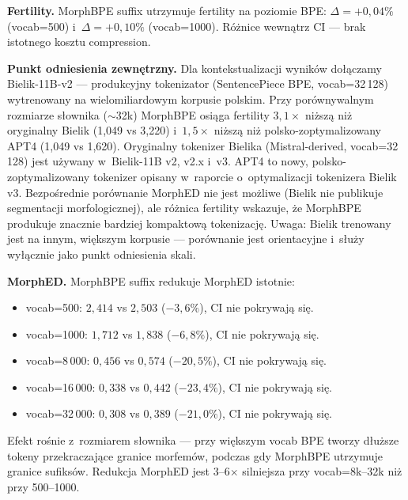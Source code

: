 \textbf{Fertility.} MorphBPE suffix utrzymuje fertility na poziomie BPE:
$\Delta = +0{,}04\%$ (vocab=500) i~$\Delta = +0{,}10\%$ (vocab=1000).
Różnice wewnątrz CI --- brak istotnego kosztu compression.

\textbf{Punkt odniesienia zewnętrzny.}
Dla kontekstualizacji wyników dołączamy Bielik-11B-v2 --- produkcyjny
tokenizator (SentencePiece BPE, vocab=32\,128) wytrenowany na wielomiliardowym
korpusie polskim. Przy porównywalnym rozmiarze słownika ($\sim$32k)
MorphBPE osiąga fertility $3{,}1\times$ niższą niż oryginalny Bielik
(1{,}049 vs 3{,}220) i~$1{,}5\times$ niższą niż polsko-zoptymalizowany
APT4 (1{,}049 vs 1{,}620). Oryginalny tokenizer Bielika (Mistral-derived,
vocab=32\,128) jest używany w~Bielik-11B v2, v2.x i~v3.
APT4 to nowy, polsko-zoptymalizowany tokenizer opisany w~raporcie
o~optymalizacji tokenizera Bielik v3.
Bezpośrednie porównanie MorphED nie jest możliwe (Bielik nie
publikuje segmentacji morfologicznej), ale różnica fertility wskazuje,
że MorphBPE produkuje znacznie bardziej kompaktową tokenizację.
Uwaga: Bielik trenowany jest na innym, większym korpusie --- porównanie
jest orientacyjne i~służy wyłącznie jako punkt odniesienia skali.

\textbf{MorphED.} MorphBPE suffix redukuje MorphED istotnie:
\begin{itemize}
  \item vocab=500: $2{,}414$ vs $2{,}503$ ($-3{,}6\%$), CI nie pokrywają się.
  \item vocab=1000: $1{,}712$ vs $1{,}838$ ($-6{,}8\%$), CI nie pokrywają się.
  \item vocab=8\,000: $0{,}456$ vs $0{,}574$ ($-20{,}5\%$), CI nie pokrywają się.
  \item vocab=16\,000: $0{,}338$ vs $0{,}442$ ($-23{,}4\%$), CI nie pokrywają się.
  \item vocab=32\,000: $0{,}308$ vs $0{,}389$ ($-21{,}0\%$), CI nie pokrywają się.
\end{itemize}
Efekt rośnie z~rozmiarem słownika --- przy większym vocab BPE tworzy
dłuższe tokeny przekraczające granice morfemów, podczas gdy MorphBPE
utrzymuje granice sufiksów. Redukcja MorphED jest 3--6$\times$ silniejsza
przy vocab=8k--32k niż przy 500--1000.

